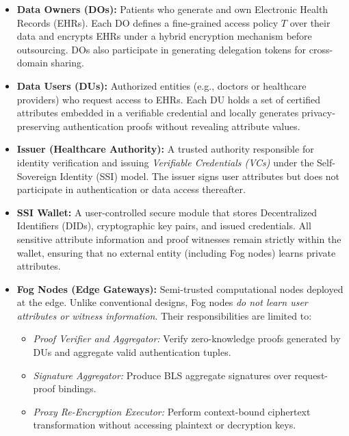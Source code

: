 \documentclass[conference]{IEEEtran}
\begin{document}
\begin{itemize}

\item \textbf{Data Owners (DOs):}  
Patients who generate and own Electronic Health Records (EHRs). Each DO defines a fine-grained access policy $T$ over their data and encrypts EHRs under a hybrid encryption mechanism before outsourcing. DOs also participate in generating delegation tokens for cross-domain sharing.

\item \textbf{Data Users (DUs):}  
Authorized entities (e.g., doctors or healthcare providers) who request access to EHRs. Each DU holds a set of certified attributes embedded in a verifiable credential and locally generates privacy-preserving authentication proofs without revealing attribute values.

\item \textbf{Issuer (Healthcare Authority):}  
A trusted authority responsible for identity verification and issuing \emph{Verifiable Credentials (VCs)} under the Self-Sovereign Identity (SSI) model. The issuer signs user attributes but does not participate in authentication or data access thereafter.

\item \textbf{SSI Wallet:}  
A user-controlled secure module that stores Decentralized Identifiers (DIDs), cryptographic key pairs, and issued credentials. All sensitive attribute information and proof witnesses remain strictly within the wallet, ensuring that no external entity (including Fog nodes) learns private attributes.

\item \textbf{Fog Nodes (Edge Gateways):}  
Semi-trusted computational nodes deployed at the edge. Unlike conventional designs, Fog nodes \emph{do not learn user attributes or witness information}. Their responsibilities are limited to:
\begin{itemize}
    \item \emph{Proof Verifier and Aggregator:} Verify zero-knowledge proofs generated by DUs and aggregate valid authentication tuples.
    \item \emph{Signature Aggregator:} Produce BLS aggregate signatures over request-proof bindings.
    \item \emph{Proxy Re-Encryption Executor:} Perform context-bound ciphertext transformation without accessing plaintext or decryption keys.
\end{itemize}


\end{itemize}
\end{document}

